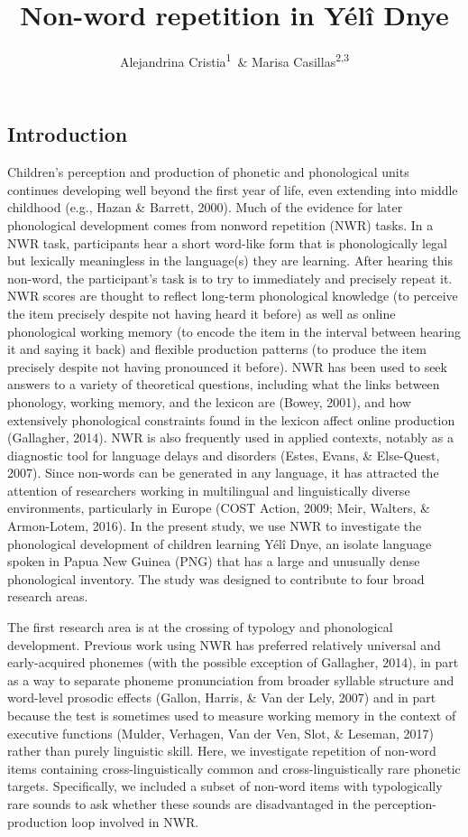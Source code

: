 \documentclass[english,,man,floatsintext]{apa6}
\author{Alejandrina Cristia\textsuperscript{1}\ \& Marisa Casillas\textsuperscript{2,3}}
\affiliation{
\vspace{0.5cm}
\textsuperscript{1} Laboratoire de Sciences Cognitives et de Psycholinguistique, Département d'Etudes cognitives, ENS, EHESS, CNRS, PSL University\\\textsuperscript{2} Max Planck Institute for Psycholinguistics\\\textsuperscript{3} University of Chicago}
\title{Non-word repetition in Yélî Dnye}
\date{}
\begin{document}
\maketitle

\hypertarget{introduction}{%
\subsection{Introduction}\label{introduction}}

Children's perception and production of phonetic and phonological units continues developing well beyond the first year of life, even extending into middle childhood (e.g., Hazan \& Barrett, 2000). Much of the evidence for later phonological development comes from nonword repetition (NWR) tasks. In a NWR task, participants hear a short word-like form that is phonologically legal but lexically meaningless in the language(s) they are learning. After hearing this non-word, the participant's task is to try to immediately and precisely repeat it. NWR scores are thought to reflect long-term phonological knowledge (to perceive the item precisely despite not having heard it before) as well as online phonological working memory (to encode the item in the interval between hearing it and saying it back) and flexible production patterns (to produce the item precisely despite not having pronounced it before). NWR has been used to seek answers to a variety of theoretical questions, including what the links between phonology, working memory, and the lexicon are (Bowey, 2001), and how extensively phonological constraints found in the lexicon affect online production (Gallagher, 2014). NWR is also frequently used in applied contexts, notably as a diagnostic tool for language delays and disorders (Estes, Evans, \& Else-Quest, 2007). Since non-words can be generated in any language, it has attracted the attention of researchers working in multilingual and linguistically diverse environments, particularly in Europe (COST Action, 2009; Meir, Walters, \& Armon-Lotem, 2016). In the present study, we use NWR to investigate the phonological development of children learning Yélî Dnye, an isolate language spoken in Papua New Guinea (PNG) that has a large and unusually dense phonological inventory. The study was designed to contribute to four broad research areas.

The first research area is at the crossing of typology and phonological development. Previous work using NWR has preferred relatively universal and early-acquired phonemes (with the possible exception of Gallagher, 2014), in part as a way to separate phoneme pronunciation from broader syllable structure and word-level prosodic effects (Gallon, Harris, \& Van der Lely, 2007) and in part because the test is sometimes used to measure working memory in the context of executive functions (Mulder, Verhagen, Van der Ven, Slot, \& Leseman, 2017) rather than purely linguistic skill. Here, we investigate repetition of non-word items containing cross-linguistically common and cross-linguistically rare phonetic targets. Specifically, we included a subset of non-word items with typologically rare sounds to ask whether these sounds are disadvantaged in the perception-production loop involved in NWR.
\end{document}
